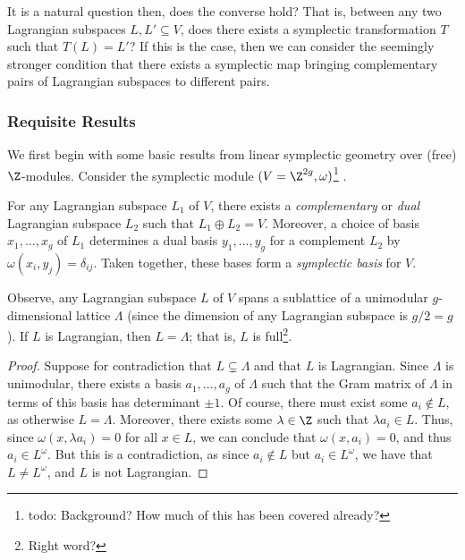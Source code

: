 It is a natural question then, does the converse hold? That is, between any two Lagrangian subspaces $L,L' \subseteq V$, does there exists a symplectic transformation $T$ such that $T(L) = L'$? If this is the case, then we can consider the seemingly stronger condition that there exists a symplectic map bringing complementary pairs of Lagrangian subspaces to different pairs.

\subsubsection*{Requisite Results}
We first begin with some basic results from linear symplectic geometry over (free) $\Z$-modules. Consider the symplectic module $(V = \Z^{2g}, \omega)$\footnote{todo: Background? How much of this has been covered already?} .
\begin{theorem}
	For any Lagrangian subspace $L_1$ of $V$, there exists a \textit{complementary} or \textit{dual} Lagrangian subspace $L_2$ such that $L_1 \oplus L_2 = V$. Moreover, a choice of basis $x_1,\dots,x_g$ of $L_1$ determines a dual basis $y_1,\dots,y_g$ for a complement $L_2$ by $\omega(x_i, y_j) = \delta_{ij}$. Taken together, these bases form a \textit{symplectic basis} for $V$. 
\end{theorem}

\begin{proposition}
	\label{prp:lagrangian_unimodular}
	Observe, any Lagrangian subspace $L$ of $V$ spans a sublattice of a unimodular $g$-dimensional lattice $\Lambda$ (since the dimension of any Lagrangian subspace is $g/2 = g$). If $L$ is Lagrangian, then $L = \Lambda$; that is, $L$ is full\footnote{Right word?}.
\end{proposition}
\begin{proof}
	Suppose for contradiction that $L \subsetneq \Lambda$ and that $L$ is Lagrangian. Since $\Lambda$ is unimodular, there exists a basis $a_1,\dots,a_g$ of $\Lambda$ such that the Gram matrix of $\Lambda$ in terms of this basis has determinant $\pm 1$. Of course, there must exist some $a_i \notin L$, as otherwise $L = \Lambda$. Moreover, there exists some $\lambda \in \Z$ such that $\lambda a_i \in L$. Thus, since $\omega(x, \lambda a_i) = 0$ for all $x \in L$, we can conclude that $\omega(x, a_i) = 0$, and thus $a_i \in L^\omega$. But this is a contradiction, as since $a_i \notin L$ but $a_i \in L^\omega$, we have that $L \neq L^\omega$, and $L$ is not Lagrangian.
\end{proof}

